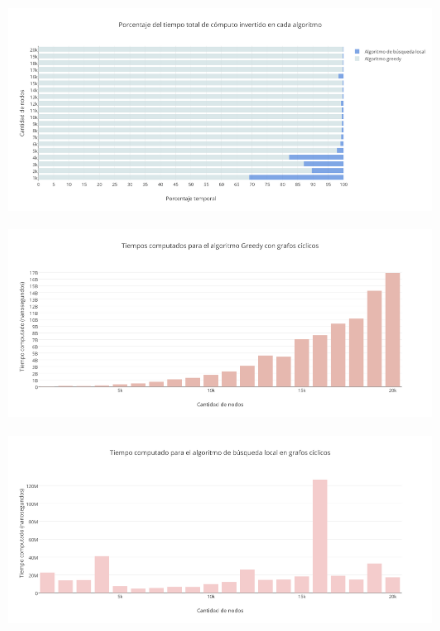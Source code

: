  \begin{figure}[H]
    \begin{center}
  	\includegraphics[width=18cm]{imagenes/Ej5/ComparacionTiemposCiclico.png}
 	\label{ComparacionTiemposCiclico}
    \end{center}
  \end{figure}

 \begin{figure}[H]
    \begin{center}
  	\includegraphics[width=18cm]{imagenes/Ej5/TiempoGreedyCiclico.png}
 	\label{TiempoGreedyCiclico}
    \end{center}
  \end{figure}

 \begin{figure}[H]
    \begin{center}
  	\includegraphics[width=18cm]{imagenes/Ej5/TiempoLocalCiclico.png}
 	\label{TiempoLocalCiclico}
    \end{center}
  \end{figure}

